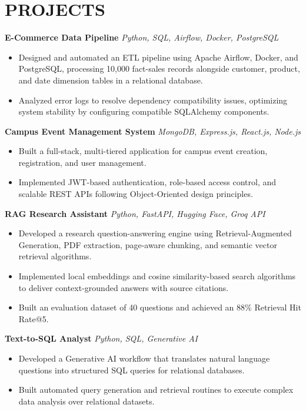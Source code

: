\documentclass[a4paper,10pt]{article}
\begin{document}
\section*{PROJECTS}

\textbf{E-Commerce Data Pipeline}
\hfill
\textit{Python, SQL, Airflow, Docker, PostgreSQL}

\begin{itemize}
    \item Designed and automated an ETL pipeline using Apache Airflow, Docker, and PostgreSQL, processing 10,000 fact-sales records alongside customer, product, and date dimension tables in a relational database.
    \item Analyzed error logs to resolve dependency compatibility issues, optimizing system stability by configuring compatible SQLAlchemy components.
\end{itemize}

\textbf{Campus Event Management System}
\hfill
\textit{MongoDB, Express.js, React.js, Node.js}

\begin{itemize}
    \item Built a full-stack, multi-tiered application for campus event creation, registration, and user management.
    \item Implemented JWT-based authentication, role-based access control, and scalable REST APIs following Object-Oriented design principles.
\end{itemize}

\textbf{RAG Research Assistant}
\hfill
\textit{Python, FastAPI, Hugging Face, Groq API}

\begin{itemize}
    \item Developed a research question-answering engine using Retrieval-Augmented Generation, PDF extraction, page-aware chunking, and semantic vector retrieval algorithms.
    \item Implemented local embeddings and cosine similarity-based search algorithms to deliver context-grounded answers with source citations.
    \item Built an evaluation dataset of 40 questions and achieved an 88\% Retrieval Hit Rate@5.
\end{itemize}

\textbf{Text-to-SQL Analyst}
\hfill
\textit{Python, SQL, Generative AI}

\begin{itemize}
    \item Developed a Generative AI workflow that translates natural language questions into structured SQL queries for relational databases.
    \item Built automated query generation and retrieval routines to execute complex data analysis over relational datasets.
\end{itemize}
\end{document}
